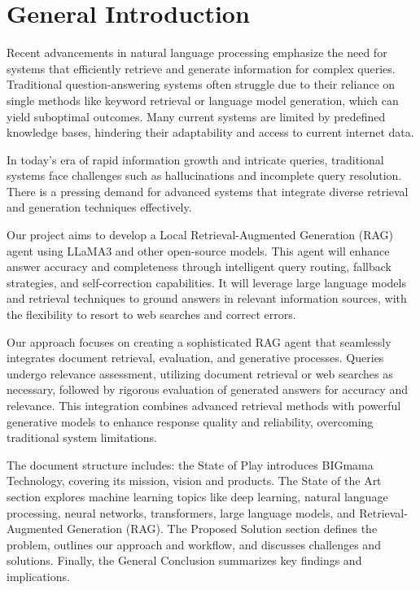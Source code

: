 \chapter{General Introduction}

Recent advancements in natural language processing emphasize the need for systems that efficiently retrieve and generate information for complex queries. Traditional question-answering systems often struggle due to their reliance on single methods like keyword retrieval or language model generation, which can yield suboptimal outcomes. Many current systems are limited by predefined knowledge bases, hindering their adaptability and access to current internet data.

\hfill

In today's era of rapid information growth and intricate queries, traditional systems face challenges such as hallucinations and incomplete query resolution. There is a pressing demand for advanced systems that integrate diverse retrieval and generation techniques effectively.

\hfill

Our project aims to develop a Local Retrieval-Augmented Generation (RAG) agent using LLaMA3 and other open-source models. This agent will enhance answer accuracy and completeness through intelligent query routing, fallback strategies, and self-correction capabilities. It will leverage large language models and retrieval techniques to ground answers in relevant information sources, with the flexibility to resort to web searches and correct errors.

\hfill

Our approach focuses on creating a sophisticated RAG agent that seamlessly integrates document retrieval, evaluation, and generative processes. Queries undergo relevance assessment, utilizing document retrieval or web searches as necessary, followed by rigorous evaluation of generated answers for accuracy and relevance. This integration combines advanced retrieval methods with powerful generative models to enhance response quality and reliability, overcoming traditional system limitations.

\hfill

The document structure includes: the State of Play introduces BIGmama Technology, covering its mission, vision and products. The State of the Art section explores machine learning topics like deep learning, natural language processing, neural networks, transformers, large language models, and Retrieval-Augmented Generation (RAG). The Proposed Solution section defines the problem, outlines our approach and workflow, and discusses challenges and solutions. Finally, the General Conclusion summarizes key findings and implications.
